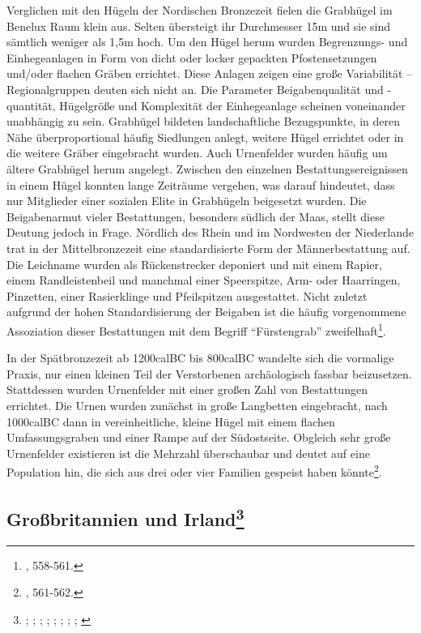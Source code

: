 \documentclass[openany,twoside,twocolumn]{book}
\let\rmarkdownfootnote\footnote%
\def\footnote{\protect\rmarkdownfootnote}
\begin{document}
Verglichen mit den Hügeln der Nordischen Bronzezeit fielen die Grabhügel
im Benelux Raum klein aus. Selten übersteigt ihr Durchmesser 15m und sie
sind sämtlich weniger als 1,5m hoch. Um den Hügel herum wurden
Begrenzungs- und Einhegeanlagen in Form von dicht oder locker gepackten
Pfostensetzungen und/oder flachen Gräben errichtet. Diese Anlagen zeigen
eine große Variabilität -- Regionalgruppen deuten sich nicht an. Die
Parameter Beigabenqualität und -quantität, Hügelgröße und Komplexität
der Einhegeanlage scheinen voneinander unabhängig zu sein. Grabhügel
bildeten landschaftliche Bezugspunkte, in deren Nähe überproportional
häufig Siedlungen anlegt, weitere Hügel errichtet oder in die weitere
Gräber eingebracht wurden. Auch Urnenfelder wurden häufig um ältere
Grabhügel herum angelegt. Zwischen den einzelnen Bestattungsereignissen
in einem Hügel konnten lange Zeiträume vergehen, was darauf hindeutet,
dass nur Mitglieder einer sozialen Elite in Grabhügeln beigesetzt
wurden. Die Beigabenarmut vieler Bestattungen, besonders südlich der
Maas, stellt diese Deutung jedoch in Frage. Nördlich des Rhein und im
Nordwesten der Niederlande trat in der Mittelbronzezeit eine
standardisierte Form der Männerbestattung auf. Die Leichname wurden als
Rückenstrecker deponiert und mit einem Rapier, einem Randleistenbeil und
manchmal einer Speerspitze, Arm- oder Haarringen, Pinzetten, einer
Rasierklinge und Pfeilspitzen ausgestattet. Nicht zuletzt aufgrund der
hohen Standardisierung der Beigaben ist die häufig vorgenommene
Assoziation dieser Bestattungen mit dem Begriff ``Fürstengrab''
zweifelhaft\footnote{\textcite{fokkens_bronze_2013}, 558-561.}.

In der Spätbronzezeit ab 1200calBC bis 800calBC wandelte sich die
vormalige Praxis, nur einen kleinen Teil der Verstorbenen archäologisch
fassbar beizusetzen. Stattdessen wurden Urnenfelder mit einer großen
Zahl von Bestattungen errichtet. Die Urnen wurden zunächst in große
Langbetten eingebracht, nach 1000calBC dann in vereinheitliche, kleine
Hügel mit einem flachen Umfassungsgraben und einer Rampe auf der
Südostseite. Obgleich sehr große Urnenfelder existieren ist die Mehrzahl
überschaubar und deutet auf eine Population hin, die sich aus drei oder
vier Familien gespeist haben könnte\footnote{\textcite{fokkens_bronze_2013},
  561-562.}.

\hypertarget{grobritannien-und-irland}{%
\subsection[Großbritannien und Irland]{\texorpdfstring{Großbritannien
und Irland\footnote{\textcite{bradley_prehistory_2007};
  \textcite{bruck_bronze_2001}; \textcite{bruck_death_2006};
  \textcite{burgess_age_1980}; \textcite{eogan_construction_2004};
  \textcite{medina-pettersson_bronze_2014};
  \textcite{roberts_britain_2013}; \textcite{rogers_afterlife_2013};
  \textcite{waddell_bronze_1990}}}{Großbritannien und Irland}}\label{grobritannien-und-irland}}
\end{document}
